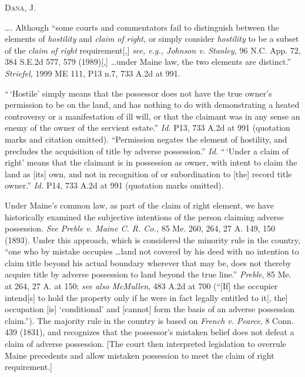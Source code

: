 
\opinion \textsc{Dana}, J.

\ldots. Although ``some courts and commentators fail to distinguish between the
elements of \textit{hostility} and \textit{claim of} \textit{right,} or simply
consider \textit{hostility} to be a subset of the \textit{claim of right}
requirement[,] \textit{see, e.g., Johnson v. Stanley,} 96 N.C. App. 72, 384
S.E.2d 577, 579 (1989)[,]  \ldots under Maine law, the two elements are
distinct.'' \textit{Striefel,} 1999 ME 111, P13 n.7, 733 A.2d at 991.

``\,`Hostile' simply means that the possessor does not have the true owner's
permission to be on the land, and has nothing to do with demonstrating a heated
controversy or a manifestation of ill will, or that the claimant was in any
sense an enemy of the owner of the servient estate.'' \textit{Id.} P13, 733
A.2d at 991 (quotation marks and citation omitted). ``Permission negates the
element of hostility, and precludes the acquisition of title by adverse
possession.'' \textit{Id.} ``\,`Under a claim of right' means that the claimant
is in possession as owner, with intent to claim the land as [its] own, and not
in recognition of or subordination to [the] record title owner.'' \textit{Id.}
P14, 733 A.2d at 991 (quotation marks omitted).

Under Maine's common law, as part of the claim of right element, we have
historically examined the subjective intentions of the person claiming
adverse possession. \textit{See Preble v. Maine C. R. Co.,} 85 Me. 260, 264, 27
A. 149, 150 (1893). Under this approach, which is considered the minority rule
in the country, ``one who by mistake occupies \ldots land not covered by his
deed with no intention to claim title beyond his actual boundary wherever that
may be, does not thereby acquire title by adverse possession to land beyond the
true line.'' \textit{Preble}, 85 Me. at 264, 27 A. at 150; \textit{see also
McMullen}, 483 A.2d at 700 (``[If] the occupier intend[s] to hold the property
only if he were in fact legally entitled to it[, the] occupation [is]
`conditional' and [cannot] form the basis of an adverse possession claim.'').
The majority rule in the country is based on \textit{French v. Pearce}, 8 Conn.
439 (1831), and recognizes that the possessor's mistaken belief does not defeat
a claim of adverse possession. [The court then interpreted legislation to
overrule Maine precedents and allow mistaken possession to meet the claim of
right requirement.]

